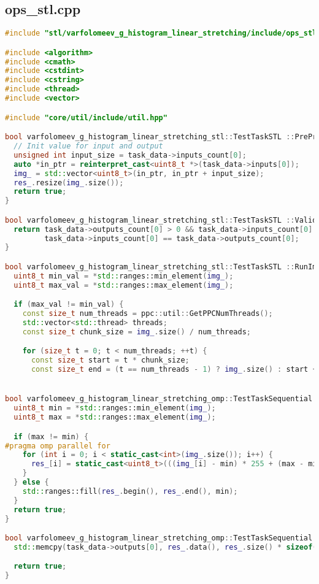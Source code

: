 \documentclass[a4paper,12pt]{article}
\begin{document}
\subsection{ops\_stl.cpp}
\begin{lstlisting}[language=C++,
    breaklines=true,       % Автоматический перенос строк
    basicstyle=\small\ttfamily, % Уменьшенный шрифт
    columns=fullflexible ]
    #include "stl/varfolomeev_g_histogram_linear_stretching/include/ops_stl.hpp"

#include <algorithm>
#include <cmath>
#include <cstdint>
#include <cstring>
#include <thread>
#include <vector>

#include "core/util/include/util.hpp"

bool varfolomeev_g_histogram_linear_stretching_stl::TestTaskSTL ::PreProcessingImpl() {
  // Init value for input and output
  unsigned int input_size = task_data->inputs_count[0];
  auto *in_ptr = reinterpret_cast<uint8_t *>(task_data->inputs[0]);
  img_ = std::vector<uint8_t>(in_ptr, in_ptr + input_size);
  res_.resize(img_.size());
  return true;
}

bool varfolomeev_g_histogram_linear_stretching_stl::TestTaskSTL ::ValidationImpl() {
  return task_data->outputs_count[0] > 0 && task_data->inputs_count[0] > 0 &&
         task_data->inputs_count[0] == task_data->outputs_count[0];
}

bool varfolomeev_g_histogram_linear_stretching_stl::TestTaskSTL ::RunImpl() {
  uint8_t min_val = *std::ranges::min_element(img_);
  uint8_t max_val = *std::ranges::max_element(img_);

  if (max_val != min_val) {
    const size_t num_threads = ppc::util::GetPPCNumThreads();
    std::vector<std::thread> threads;
    const size_t chunk_size = img_.size() / num_threads;

    for (size_t t = 0; t < num_threads; ++t) {
      const size_t start = t * chunk_size;
      const size_t end = (t == num_threads - 1) ? img_.size() : start + chunk_size;


bool varfolomeev_g_histogram_linear_stretching_omp::TestTaskSequential::RunImpl() {
  uint8_t min = *std::ranges::min_element(img_);
  uint8_t max = *std::ranges::max_element(img_);

  if (max != min) {
#pragma omp parallel for
    for (int i = 0; i < static_cast<int>(img_.size()); i++) {
      res_[i] = static_cast<uint8_t>(((img_[i] - min) * 255 + (max - min) / 2) / (max - min));
    }
  } else {
    std::ranges::fill(res_.begin(), res_.end(), min);
  }
  return true;
}

bool varfolomeev_g_histogram_linear_stretching_omp::TestTaskSequential::PostProcessingImpl() {
  std::memcpy(task_data->outputs[0], res_.data(), res_.size() * sizeof(uint8_t));

  return true;
}
    \end{lstlisting}
\end{document}
